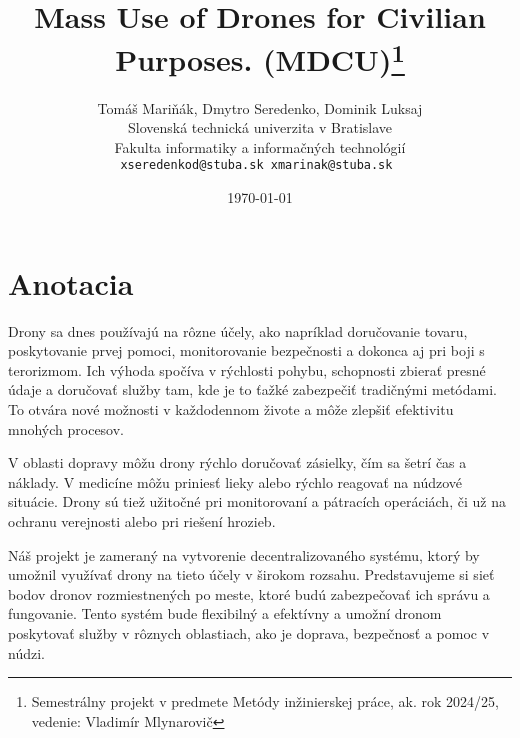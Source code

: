 \documentclass[10pt,a4paper]{article}
\title{Mass Use of Drones for Civilian Purposes. (\textbf{MDCU})\thanks{Semestrálny projekt v predmete Metódy inžinierskej práce, ak. rok 2024/25, vedenie: Vladimír Mlynarovič}}
\author{Tomáš Mariňák, Dmytro Seredenko, Dominik Luksaj\\[2pt]
	{\small Slovenská technická univerzita v Bratislave}\\
	{\small Fakulta informatiky a informačných technológií}\\
	{\small \texttt{xseredenkod@stuba.sk xmarinak@stuba.sk }}}
\date{\small \today}
\begin{document}
\maketitle

\section{Anotacia}

 Drony sa dnes používajú na rôzne účely, ako napríklad doručovanie tovaru, poskytovanie prvej pomoci, monitorovanie bezpečnosti a dokonca aj pri boji s terorizmom.  Ich výhoda spočíva v rýchlosti pohybu,  schopnosti zbierať presné údaje a doručovať služby tam, kde je to ťažké zabezpečiť tradičnými metódami. To otvára nové možnosti v každodennom živote a môže zlepšiť efektivitu mnohých procesov.

 V oblasti dopravy môžu drony rýchlo doručovať zásielky, čím sa šetrí čas a náklady. V medicíne môžu priniesť lieky alebo rýchlo reagovať na núdzové situácie. Drony sú tiež užitočné pri monitorovaní a pátracích operáciách, či už na ochranu verejnosti alebo pri riešení hrozieb.

 Náš projekt je zameraný na vytvorenie decentralizovaného systému, ktorý by umožnil využívať drony na tieto účely v širokom rozsahu. Predstavujeme si sieť bodov dronov rozmiestnených po meste, ktoré budú zabezpečovať ich správu a fungovanie. Tento systém bude flexibilný a efektívny a umožní dronom poskytovať služby v rôznych oblastiach, ako je doprava, bezpečnosť a pomoc v núdzi.
\end{document}
